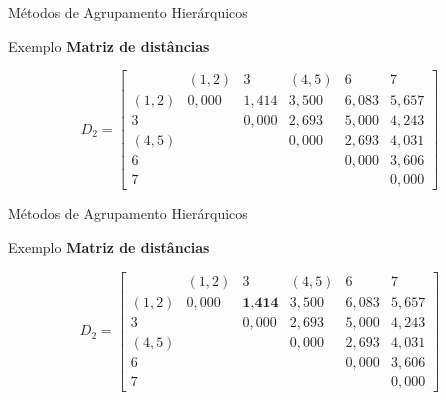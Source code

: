 \documentclass[
  ignorenonframetext,
  aspectratio=169,
]{beamer}
\begin{document}
\begin{frame}{Métodos de Agrupamento Hierárquicos}
\protect{}\label{muxe9todos-de-agrupamento-hieruxe1rquicos-20}
\begin{block}{Exemplo}
\protect{}\label{exemplo-9}
\textbf{Matriz de distâncias}

\[D_2 = \left[ \begin{matrix}
&(1,2)&3&(4,5)&6&7\\ 
(1,2)& 0,000 & 1,414 & 3,500 &  6,083 & 5,657 \\
3  &  & 0,000 & 2,693 & 5,000 & 4,243 \\
(4,5)  &  &  & 0,000 &  2,693 & 4,031 \\
6  &  &    &  & 0,000 & 3,606 \\
7  &  &    &  &  & 0,000
                    \end{matrix} \right]\]
\end{block}
\end{frame}

\begin{frame}{Métodos de Agrupamento Hierárquicos}
\protect{}\label{muxe9todos-de-agrupamento-hieruxe1rquicos-21}
\begin{block}{Exemplo}
\protect{}\label{exemplo-10}
\textbf{Matriz de distâncias}

\[D_2 = \left[ \begin{matrix}
&(1,2)&3&(4,5)&6&7\\ 
(1,2)& 0,000 & \textbf{1,414} & 3,500 &  6,083 & 5,657 \\
3  &  & 0,000 & 2,693 & 5,000 & 4,243 \\
(4,5)  &  &  & 0,000 &  2,693 & 4,031 \\
6  &  &    &  & 0,000 & 3,606 \\
7  &  &    &  &  & 0,000
                    \end{matrix} \right]\]
\end{block}
\end{frame}
\end{document}
